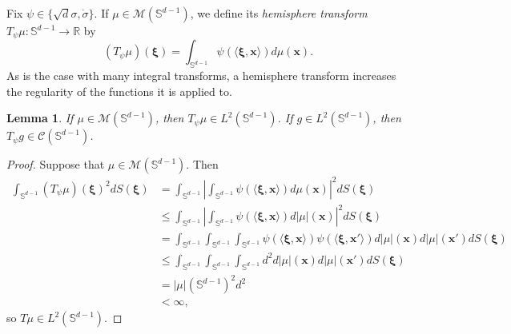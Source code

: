 \documentclass{article}
\newtheorem{lemma}[theorem]{Lemma}
\theoremstyle{definition}
\newcommand*{\R}{\mathbb{R}}
\newcommand{\mc}{\mathcal}
\renewcommand{\S}{\mathbb{S}}
\def\vx{{\bm{x}}}
\begin{document}
Fix $\psi \in \{\sqrt{d}\sigma, \dot{\sigma}\}$. If $\mu \in \mc{M}(\S^{d - 1})$, we define its \emph{hemisphere transform} \citep{rubin1999inversion} $T_{\psi}\mu: \S^{d - 1} \to \R$ by
\[(T_{\psi}\mu)(\bm{\xi}) = \int_{\S^{d - 1}}\psi(\langle \bm{\xi}, \vx \rangle) d\mu(\vx). \]
As is the case with many integral transforms, a hemisphere transform increases the regularity of the functions it is applied to.
\begin{lemma}
    If $\mu \in \mc{M}(\S^{d - 1})$, then $T_{\psi}\mu \in L^2(\S^{d - 1})$. If $g \in L^2(\S^{d - 1})$, then $T_{\psi}g \in \mc{C}(\S^{d - 1})$.
\end{lemma}
\begin{proof}
    Suppose that $\mu \in \mc{M}(\S^{d - 1})$. Then
    \begin{align*}
        \int_{\S^{d-1}} (T_{\psi}\mu)(\bm{\xi})^2 dS(\bm{\xi}) &= \int_{\S^{d-1}}\left|\int_{\S^{d-1}}\psi(\langle \bm{\xi}, \vx \rangle) d\mu(\vx) \right|^2 dS(\bm{\xi})\\
        &\leq \int_{\S^{d-1}}\left|\int_{\S^{d-1}} \psi(\langle \bm{\xi}, \vx \rangle) d|\mu|(\vx) \right|^2dS(\bm{\xi})\\
        &= \int_{\S^{d-1}} \int_{\S^{d-1}}\int_{\S^{d-1}}\psi(\langle \bm{\xi}, \vx \rangle)\psi(\langle \bm{\xi}, \vx' \rangle)d|\mu|(\vx)d|\mu|(\vx')dS(\bm{\xi})\\
        &\leq\int_{\S^{d-1}} \int_{\S^{d-1}}\int_{\S^{d-1}}d^2 d|\mu|(\vx)d|\mu|(\vx')dS(\bm{\xi})\\
        &= |\mu|(\S^{d-1})^2 d^2\\
        &< \infty,
    \end{align*}
    so $T \mu \in L^2(\S^{d-1})$.


\end{proof}
\end{document}
